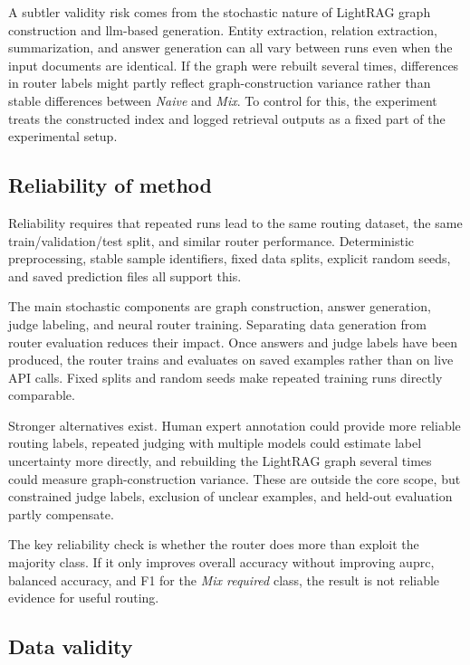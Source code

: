 \documentclass[english, bibtex]{kththesis}               %
\numberwithin{listing}{chapter}
\begin{document}
A subtler validity risk comes from the stochastic nature of LightRAG graph construction and \gls{llm}-based generation. Entity extraction, relation extraction, summarization, and answer generation can all vary between runs even when the input documents are identical. If the graph were rebuilt several times, differences in router labels might partly reflect graph-construction variance rather than stable differences between \emph{Naive} and \emph{Mix}. To control for this, the experiment treats the constructed index and logged retrieval outputs as a fixed part of the experimental setup.

\subsection{Reliability of method}
\label{sec:reliabilityOfMethod}

Reliability requires that repeated runs lead to the same routing dataset, the same train/validation/test split, and similar router performance. Deterministic preprocessing, stable sample identifiers, fixed data splits, explicit random seeds, and saved prediction files all support this.

The main stochastic components are graph construction, answer generation, judge labeling, and neural router training. Separating data generation from router evaluation reduces their impact. Once answers and judge labels have been produced, the router trains and evaluates on saved examples rather than on live \gls{API} calls. Fixed splits and random seeds make repeated training runs directly comparable.

Stronger alternatives exist. Human expert annotation could provide more reliable routing labels, repeated judging with multiple models could estimate label uncertainty more directly, and rebuilding the LightRAG graph several times could measure graph-construction variance. These are outside the core scope, but constrained judge labels, exclusion of unclear examples, and held-out evaluation partly compensate.

The key reliability check is whether the router does more than exploit the majority class. If it only improves overall accuracy without improving \gls{auprc}, balanced accuracy, and F1 for the \emph{Mix required} class, the result is not reliable evidence for useful routing.

\subsection{Data validity}
\label{sec:dataValidity}
\end{document}
